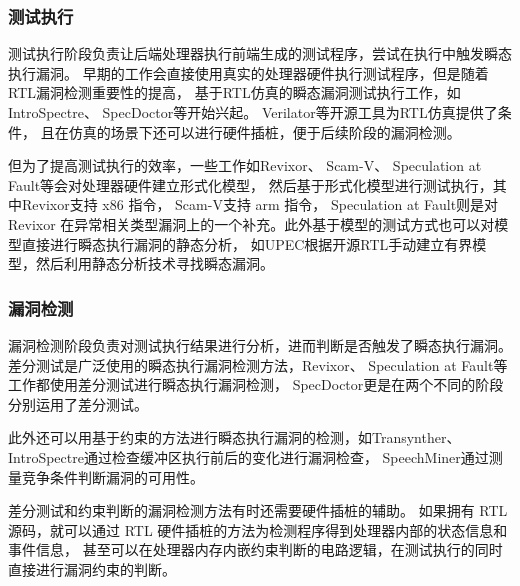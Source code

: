 \subsubsection{测试执行}

测试执行阶段负责让后端处理器执行前端生成的测试程序，尝试在执行中触发瞬态执行漏洞。
早期的工作会直接使用真实的处理器硬件执行测试程序，但是随着RTL漏洞检测重要性的提高，
基于RTL仿真的瞬态漏洞测试执行工作，如IntroSpectre\cite{ghaniyoun2021introspectre}、
SpecDoctor\cite{hur2022specdoctor}等开始兴起。
Verilator\cite{snyder2013verilator}等开源工具为RTL仿真提供了条件，
且在仿真的场景下还可以进行硬件插桩，便于后续阶段的漏洞检测。\par

但为了提高测试执行的效率，一些工作如Revixor\cite{oleksenko2022revizor}、
Scam-V\cite{nemati2020validation}、
Speculation at Fault\cite{hofmann2023speculation}等会对处理器硬件建立形式化模型，
然后基于形式化模型进行测试执行，其中Revixor\cite{oleksenko2022revizor}支持 x86 指令，
Scam-V\cite{hofmann2023speculation}支持 arm 指令，
Speculation at Fault\cite{hofmann2023speculation}则是对Revixor\cite{oleksenko2022revizor}
在异常相关类型漏洞上的一个补充。此外基于模型的测试方式也可以对模型直接进行瞬态执行漏洞的静态分析，
如UPEC\cite{fadiheh2020formal}根据开源RTL手动建立有界模型，然后利用静态分析技术寻找瞬态漏洞。

\subsubsection{漏洞检测}

漏洞检测阶段负责对测试执行结果进行分析，进而判断是否触发了瞬态执行漏洞。
差分测试是广泛使用的瞬态执行漏洞检测方法，Revixor\cite{oleksenko2022revizor}、
Speculation at Fault\cite{hofmann2023speculation}等工作都使用差分测试进行瞬态执行漏洞检测，
SpecDoctor\cite{hur2022specdoctor}更是在两个不同的阶段分别运用了差分测试。\par

此外还可以用基于约束的方法进行瞬态执行漏洞的检测，如Transynther\cite{moghimi2020medusa}、
IntroSpectre\cite{ghaniyoun2021introspectre}通过检查缓冲区执行前后的变化进行漏洞检查，
SpeechMiner\cite{xiao2019speechminer}通过测量竞争条件判断漏洞的可用性。\par

差分测试和约束判断的漏洞检测方法有时还需要硬件插桩的辅助。
如果拥有 RTL 源码，就可以通过 RTL 硬件插桩的方法为检测程序得到处理器内部的状态信息和事件信息，
甚至可以在处理器内存内嵌约束判断的电路逻辑，在测试执行的同时直接进行漏洞约束的判断。

